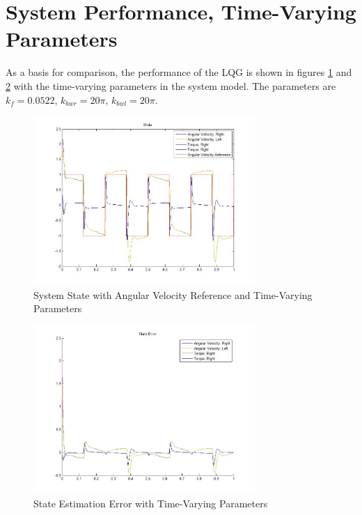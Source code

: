 \documentclass[letterpaper,12pt]{report}
\begin{document}
\section{System Performance, Time-Varying Parameters}
As a basis for comparison, the performance of the LQG is shown in figures \ref{fig:ssTVpDiagram1} and \ref{fig:seTVpDiagram1} with the time-varying parameters in the system model.
The parameters are $k_f = 0.0522$, $k_{bwr} = 20\pi$, $k_{bwl} = 20\pi$.
\begin{figure}[h]
	\centering
	\includegraphics[width=0.75\textwidth]{TV_State1.jpg}
	\caption{System State with Angular Velocity Reference and Time-Varying Parameters}
	\label{fig:ssTVpDiagram1}
\end{figure}
\begin{figure}[h]
	\centering
	\includegraphics[width=0.75\textwidth]{TV_StateError1.jpg}
	\caption{State Estimation Error with Time-Varying Parameters}
	\label{fig:seTVpDiagram1}
\end{figure}
 
\end{document}

